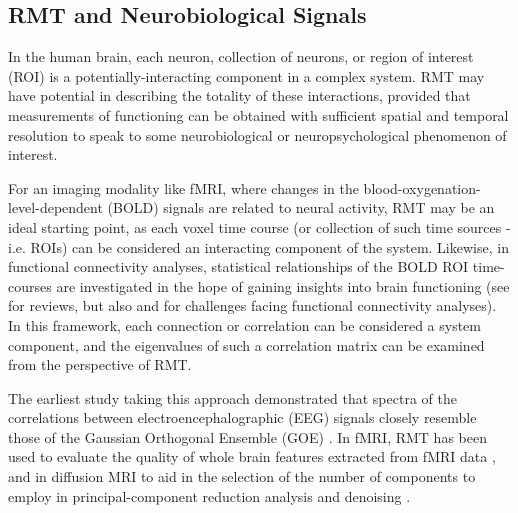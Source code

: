 \documentclass[12pt]{spieman}  %
\begin{document}
\begin{spacing}{2}
\subsection{RMT and Neurobiological Signals}

In the human brain, each neuron, collection of neurons, or region of interest
(ROI) is a potentially-interacting component in a complex system. RMT
may have potential in describing the totality of these interactions, provided
that measurements of functioning can be obtained with sufficient spatial and
temporal resolution to speak to some neurobiological or neuropsychological
phenomenon of interest.

For an imaging modality like fMRI, where changes in the
blood-oxygenation-level-dependent (BOLD) signals are related to neural
activity, RMT may be an ideal starting point, as each voxel time course (or
collection of such time sources - i.e. ROIs) can be considered an interacting
component of the system. Likewise, in functional connectivity
analyses, statistical relationships of the BOLD ROI time-courses are
investigated in the hope of gaining insights into brain functioning (see
 for reviews, but also
 and
 for challenges facing functional
connectivity analyses). In this framework, each connection or correlation can
be considered a system component, and the eigenvalues of such a correlation
matrix can be examined from the perspective of RMT.

The earliest study taking this approach
demonstrated that spectra of the correlations between electroencephalographic
(EEG) signals closely resemble those of the Gaussian Orthogonal Ensemble (GOE)
\cite{sebaRandomMatrixAnalysis2003}. In fMRI, RMT has been used to
evaluate the quality of whole brain features extracted from fMRI data
\cite{voultsidouFeatureEvaluationFMRI2007,verganiRestingStateFMRI2019}, and in
diffusion MRI to aid in the selection of the number of
components to employ in principal-component reduction analysis and denoising
\cite{veraartDenoisingDiffusionMRI2016,verganiRestingStateFMRI2019,ulfarssonDimensionEstimationNoisy2008}.


\end{spacing}
\end{document}
